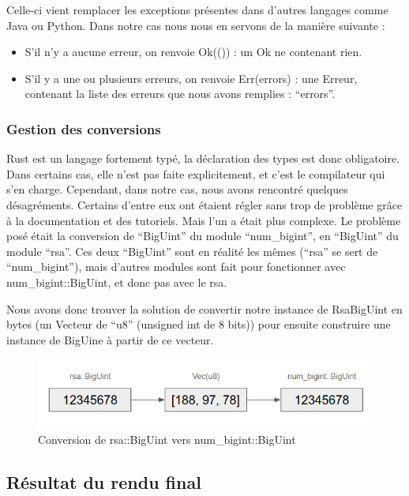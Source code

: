 \documentclass[12pt]{article} %
\begin{document}
		Celle-ci vient remplacer les exceptions présentes dans d’autres langages comme Java ou Python. Dans notre cas nous nous en servons de la manière suivante :
		
		\begin{itemize}
			\item S’il n’y a aucune erreur, on renvoie Ok(()) : un Ok ne contenant rien.
			\item S’il y a une ou plusieurs erreurs, on renvoie Err(errors) : une Erreur, contenant la liste des erreurs que nous avons remplies : “errors”.
		\end{itemize}
		
		
		\subsubsection{Gestion des conversions}

		Rust est un langage fortement typé, la déclaration des types est donc obligatoire. Dans certains cas, elle n’est pas faite explicitement, et c’est le compilateur qui s’en charge. Cependant, dans notre cas, nous avons rencontré quelques désagréments. Certains d’entre eux ont étaient régler sans trop de problème grâce à la documentation et des tutoriels. Mais l’un a était plus complexe. Le problème posé était la conversion de “BigUint” du module “num\_bigint”, en “BigUint” du module “rsa”. Ces deux “BigUint” sont en réalité les mêmes (“rsa” se sert de “num\_bigint”), mais d’autres modules sont fait pour fonctionner avec num\_bigint::BigUint, et donc pas avec le rsa. 
		
Nous avons donc trouver la solution de convertir notre instance de RsaBigUint en bytes (un Vecteur de “u8” (unsigned int de 8 bits)) pour ensuite construire une instance de BigUine à partir de ce vecteur.
	
	
	\begin{figure}[!h]
		\begin{center}
			\includegraphics[scale=0.5]{images/conversionBigUint}
			\caption{Conversion de rsa::BigUint vers num\_bigint::BigUint}
		\end{center}
	\end{figure}
	
	\subsection{Résultat du rendu final}
	
\end{document}
